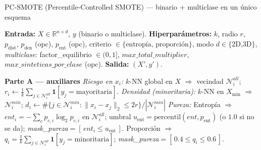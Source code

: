 \documentclass{article}
\begin{document}
\begin{algorithm}
\footnotesize                %
\caption{PC-SMOTE (Percentile-Controlled SMOTE) — binario + multiclase en un único esquema}
\begin{adjustwidth}{-0.6cm}{-0.6cm}
\begin{algorithmic}[1]

\State \textbf{Entrada:} $X\in\mathbb{R}^{n\times d}$, $y$ (binario o multiclase).
\State \textbf{Hiperparámetros:} $k$, radio $r$, $p_{\text{dist}}$, $p_{\text{den}}$ (opc), $p_{\text{ent}}$ (opc),
criterio $\in\{\text{entropía, proporción}\}$, modo $d\in\{\text{2D,3D}\}$,
\textit{multiclase}: factor\_equilibrio $\in(0,1]$, $max\_total\_multiplier$, $max\_sinteticas\_por\_clase$ (opc).
\State \textbf{Salida:} $(X',y')$.

\Statex \textbf{Parte A — auxiliares}
\State \emph{Riesgo en $x_i$:} $k$-NN global en $X$ $\Rightarrow$ vecindad $\mathcal{N}^{all}_i$;
$r_i \gets \tfrac{1}{k}\sum_{j\in \mathcal{N}^{all}_i}\mathbf{1}[y_j=\text{mayoritaria}]$.
\State \emph{Densidad (minoritaria):} $k$-NN en $X_{\min}$ $\Rightarrow$ $\mathcal{N}^{min}_i$;
$d_i \gets \#\{j\in\mathcal{N}^{min}_i:\|x_i-x_j\|_2\le 2r\}/|\mathcal{N}^{min}_i|$ 
\State \emph{Pureza:}
\Statex \quad Entropía $\Rightarrow$ $ent_i=-\sum_c p_{c,i}\log_2 p_{c,i}$ en $\mathcal{N}^{all}_i$;
umbral $u_{\text{ent}}=\mathrm{percentil}(ent,p_{\text{ent}})$ (o $1.0$ si no se da);
\emph{mask\_pureza}$=[\,ent_i\le u_{\text{ent}}\,]$.
\Statex \quad Proporción $\Rightarrow$ $q_i=\tfrac{1}{k}\sum_{j\in\mathcal{N}^{all}_i}\mathbf{1}[y_j=\text{minoritaria}]$;
\emph{mask\_pureza}$=[\,0.4\le q_i\le 0.6\,]$.


\end{algorithmic}
\end{adjustwidth}
\end{algorithm}
\end{document}
